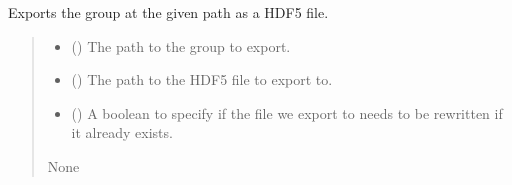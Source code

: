 \documentclass[letterpaper,10pt,english]{sphinxmanual}
\begin{document}
\begin{fulllineitems}
\begin{fulllineitems}
\label{\detokenize{_autosummary/HDF5_BLS.wrapper:HDF5_BLS.wrapper.Wrapper.export_group}}
\pysigstartsignatures
\pysiglinewithargsret
{}
{\sphinxparamcomma {}\sphinxparamcomma {}}
{}
\pysigstopsignatures
\sphinxAtStartPar
Exports the group at the given path as a HDF5 file.
\begin{quote}\begin{description}
\begin{itemize}
\item {} 
\sphinxAtStartPar
{} () \textendash{} The path to the group to export.

\item {} 
\sphinxAtStartPar
{} () \textendash{} The path to the HDF5 file to export to.

\item {} 
\sphinxAtStartPar
{} () \textendash{} A boolean to specify if the file we export to needs to be rewritten if it already exists.

\end{itemize}

\sphinxAtStartPar
None

\end{description}\end{quote}

\end{fulllineitems}



\end{fulllineitems}
\end{document}
